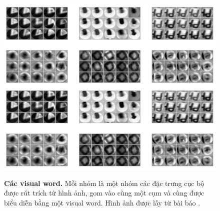 \begin{figure}[!htbp]
  \begin{center}
    \leavevmode
    \ifpdf
      \includegraphics[scale=0.32]{visualWords}
    \else
      \includegraphics[scale=0.32]{visualWords}
    \fi
    \caption[Các từ visual word]{\textbf{Các visual word.} Mỗi nhóm là một nhóm các đặc trưng cục bộ được rút trích từ hình ảnh, gom vào cùng một cụm và cùng được biểu diễn bằng một visual word. Hình ảnh được lấy từ bài báo \cite{sivic2009efficient}.}
    \label{FigVisualWords}
  \end{center}
\end{figure}

